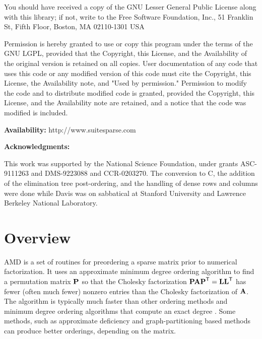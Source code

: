 \documentclass[11pt]{article}
\newcommand{\m}[1]{{\bf{#1}}}       %
\newcommand{\tr}{^{\sf T}}          %
\begin{document}
    You should have received a copy of the GNU Lesser General Public
    License along with this library; if not, write to the Free Software
    Foundation, Inc., 51 Franklin St, Fifth Floor, Boston, MA  02110-1301
    USA

    Permission is hereby granted to use or copy this program under the
    terms of the GNU LGPL, provided that the Copyright, this License,
    and the Availability of the original version is retained on all copies.
    User documentation of any code that uses this code or any modified
    version of this code must cite the Copyright, this License, the
    Availability note, and "Used by permission." Permission to modify
    the code and to distribute modified code is granted, provided the
    Copyright, this License, and the Availability note are retained,
    and a notice that the code was modified is included.

{\bf Availability:}
    http://www.suitesparse.com

{\bf Acknowledgments:}

    This work was supported by the National Science Foundation, under
    grants ASC-9111263 and DMS-9223088 and CCR-0203270.
    The conversion to C, the addition of the elimination tree
    post-ordering, and the handling of dense rows and columns
    were done while Davis was on sabbatical at
    Stanford University and Lawrence Berkeley National Laboratory.

\newpage
\section{Overview}

AMD is a set of routines for preordering a sparse matrix prior to
numerical factorization.  It uses an approximate minimum degree ordering
algorithm \cite{AmestoyDavisDuff96,AmestoyDavisDuff04}
to find a permutation matrix $\m{P}$
so that the Cholesky factorization $\m{PAP}\tr=\m{LL}\tr$ has fewer
(often much fewer) nonzero entries than the Cholesky factorization of $\m{A}$.
The algorithm is typically much faster than other ordering methods
and  minimum degree ordering
algorithms that compute an exact degree \cite{GeorgeLiu89}.
Some methods, such as approximate deficiency
\cite{RothbergEisenstat98} and graph-partitioning based methods
\cite{Chaco,KarypisKumar98e,PellegriniRomanAmestoy00,schu:01}
can produce better orderings, depending on the matrix.
\end{document}
